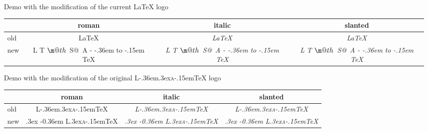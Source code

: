 \documentclass{ukart}
\makeatletter
\DeclareRobustCommand{\latex}{L%
        {\setbox0\hbox{T}%
         \setbox\@tempboxa\hbox{$\m@th$%
                                \csname S@\f@size\endcsname
                                \fontsize\sf@size\z@
                                \math@fontsfalse\selectfont
                                A}%
         \@tempdima\ht0
         \advance\@tempdima-\ht\@tempboxa
         \@tempdima\strip@pt\fontdimen1\font\@tempdima
         \advance\@tempdima-.36em
         \kern\@tempdima
         \vbox to\ht0{\box\@tempboxa
                      \vss}%
        }%
        \kern-.15em
        \TeX}
\makeatother
\begin{document}
Demo with the modification of the current \LaTeX{} logo

\begin{center}
\LARGE\begin{tabular}{l|ccc}
&\normalsize\sf roman&\normalsize\sf italic&\normalsize\sf slanted\\
\hline
\normalsize\sf old & \LaTeX & \textit{\LaTeX} & \textsl{\LaTeX} \\
\normalsize\sf new & \latex & \textit{\latex} & \textsl{\latex} \\
\end{tabular}
\end{center}
%
%
\def\LaTeX{L\kern-.36em\raise.3ex\hbox{\textsc{a}}\kern-.15em\TeX}%
\def\latex{\@tempdima.3ex
           \@tempdima\strip@pt\fontdimen1\font\@tempdima
           \advance\@tempdima-0.36em\relax
           L\kern\@tempdima\raise.3ex\hbox{\textsc{a}}\kern-.15em\TeX}%
%
\par\noindent Demo with the modification of the original \LaTeX{} logo

\begin{center}
\LARGE\begin{tabular}{l|ccc}
&\normalsize\sf roman&\normalsize\sf italic&\normalsize\sf slanted\\
\hline
\normalsize\sf old & \LaTeX & \textit{\LaTeX} & \textsl{\LaTeX} \\
\normalsize\sf new & \latex & \textit{\latex} & \textsl{\latex} \\
\end{tabular}
\end{center}
\end{document}
